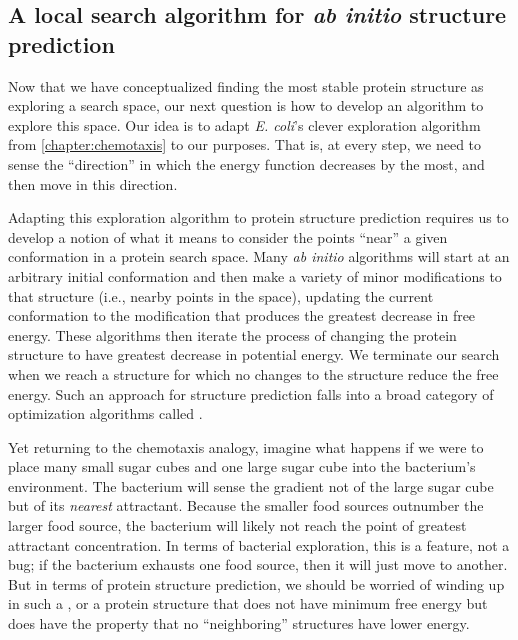 \FloatBarrier
{}
\subsection{A local search algorithm for \textit{ab initio} structure prediction}

Now that we have conceptualized finding the most stable protein structure as exploring a search space, our next question is how to develop an algorithm to explore this space. Our idea is to adapt \textit{E. coli}'s clever exploration algorithm from \autoref{chapter:chemotaxis} to our purposes. That is, at every step, we need to sense the ``direction'' in which the energy function decreases by the most, and then move in this direction.

Adapting this exploration algorithm to protein structure prediction requires us to develop a notion of what it means to consider the points ``near'' a given conformation in a protein search space. Many \textit{ab initio} algorithms will start at an arbitrary initial conformation and then make a variety of minor modifications to that structure (i.e., nearby points in the space), updating the current conformation to the modification that produces the greatest decrease in free energy. These algorithms then iterate the process of changing the protein structure to have greatest decrease in potential energy. We terminate our search when we reach a structure for which no changes to the structure reduce the free energy. Such an approach for structure prediction falls into a broad category of optimization algorithms called .

Yet returning to the chemotaxis analogy, imagine what happens if we were to place many small sugar cubes and one large sugar cube into the bacterium's environment. The bacterium will sense the gradient not of the large sugar cube but of its \textit{nearest} attractant. Because the smaller food sources outnumber the larger food source, the bacterium will likely not reach the point of greatest attractant concentration. In terms of bacterial exploration, this is a feature, not a bug; if the bacterium exhausts one food source, then it will just move to another. But in terms of protein structure prediction, we should be worried of winding up in such a , or a protein structure that does not have minimum free energy but does have  the property that no ``neighboring'' structures have lower energy.

